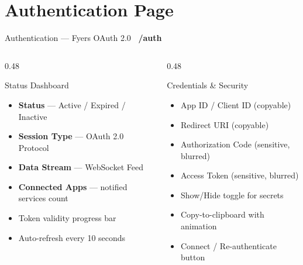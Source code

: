 \documentclass[aspectratio=169, 11pt]{beamer}
\newcommand{\tagbox}[2]{\colorbox{#1}{\scriptsize\color{white}\textbf{~#2~}}}
\begin{document}
\section{Authentication Page}
\begin{frame}{Authentication — Fyers OAuth 2.0 \hfill \tagbox{accentred}{/auth}}
\begin{columns}[T]
\begin{column}{0.48\textwidth}
\begin{block}{Status Dashboard}
\begin{itemize}
  \item \textbf{Status} — Active / Expired / Inactive
  \item \textbf{Session Type} — OAuth 2.0 Protocol
  \item \textbf{Data Stream} — WebSocket Feed
  \item \textbf{Connected Apps} — notified services count
  \item Token validity progress bar
  \item Auto-refresh every 10 seconds
\end{itemize}
\end{block}
\end{column}
\begin{column}{0.48\textwidth}
\begin{block}{Credentials \& Security}
\begin{itemize}
  \item App ID / Client ID (copyable)
  \item Redirect URI (copyable)
  \item Authorization Code (sensitive, blurred)
  \item Access Token (sensitive, blurred)
  \item Show/Hide toggle for secrets
  \item Copy-to-clipboard with animation
  \item Connect / Re-authenticate button
\end{itemize}
\end{block}
\end{column}
\end{columns}
\end{frame}

\end{document}
